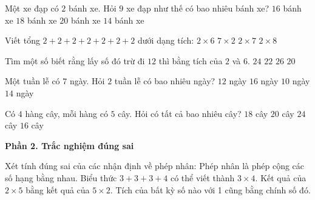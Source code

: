 \begin{ex} %
Một xe đạp có $2$ bánh xe. Hỏi $9$ xe đạp như thế có bao nhiêu bánh xe?
\choice
{$16$ bánh xe}
{\True $18$ bánh xe}
{$20$ bánh xe}
{$14$ bánh xe}
\end{ex}

\begin{ex} %
Viết tổng $2 + 2 + 2 + 2 + 2 + 2 + 2$ dưới dạng tích:
\choice
{$2 \times 6$}
{$7 \times 2$}
{\True $2 \times 7$}
{$2 \times 8$}
\end{ex}

\begin{ex} %
Tìm một số biết rằng lấy số đó trừ đi $12$ thì bằng tích của $2$ và $6$.
\choice
{\True $24$}
{$22$}
{$26$}
{$20$}
\end{ex}

\begin{ex} %
Một tuần lễ có $7$ ngày. Hỏi $2$ tuần lễ có bao nhiêu ngày?
\choice
{$12$ ngày}
{$16$ ngày}
{$10$ ngày}
{\True $14$ ngày}
\end{ex}

\begin{ex} %
Có $4$ hàng cây, mỗi hàng có $5$ cây. Hỏi có tất cả bao nhiêu cây?
\choice
{$18$ cây}
{\True $20$ cây}
{$24$ cây}
{$16$ cây}
\end{ex}

\textbf{Phần 2. Trắc nghiệm đúng sai}

\begin{ex} %
Xét tính đúng sai của các nhận định về phép nhân:
\choiceTF
{\True Phép nhân là phép cộng các số hạng bằng nhau.}
{Biểu thức $3 + 3 + 3 + 4$ có thể viết thành $3 \times 4$.}
{\True Kết quả của $2 \times 5$ bằng kết quả của $5 \times 2$.}
{\True Tích của bất kỳ số nào với 1 cũng bằng chính số đó.}
\end{ex}

